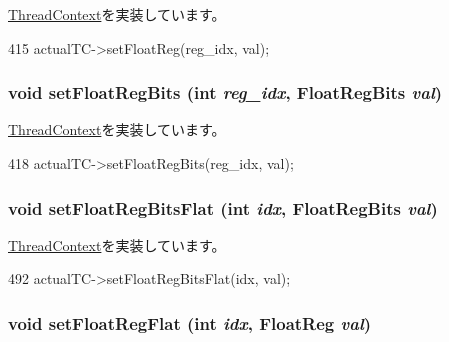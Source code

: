 \hyperlink{classThreadContext_af8dc9762fda519d911372dd6f4a28d8e}{ThreadContext}を実装しています。


\begin{DoxyCode}
415     { actualTC->setFloatReg(reg_idx, val); }
\end{DoxyCode}
\hypertarget{classProxyThreadContext_a618651078f08ecd328dfe3312f0f2ea7}{
\subsubsection[{setFloatRegBits}]{\setlength{\rightskip}{0pt plus 5cm}void setFloatRegBits (int {\em reg\_\-idx}, \/  {\bf FloatRegBits} {\em val})}}
\label{classProxyThreadContext_a618651078f08ecd328dfe3312f0f2ea7}


\hyperlink{classThreadContext_a8f0c8b07cd1c4a6019a5b3922689d1db}{ThreadContext}を実装しています。


\begin{DoxyCode}
418     { actualTC->setFloatRegBits(reg_idx, val); }
\end{DoxyCode}
\hypertarget{classProxyThreadContext_acd974292ff0461c2e94c0b5a1126b503}{
\subsubsection[{setFloatRegBitsFlat}]{\setlength{\rightskip}{0pt plus 5cm}void setFloatRegBitsFlat (int {\em idx}, \/  {\bf FloatRegBits} {\em val})}}
\label{classProxyThreadContext_acd974292ff0461c2e94c0b5a1126b503}


\hyperlink{classThreadContext_a2964ca7e974bf80017ee30d832b32a35}{ThreadContext}を実装しています。


\begin{DoxyCode}
492     { actualTC->setFloatRegBitsFlat(idx, val); }
\end{DoxyCode}
\hypertarget{classProxyThreadContext_a71ec23ca2c029120932e5af4babc0da1}{
\subsubsection[{setFloatRegFlat}]{\setlength{\rightskip}{0pt plus 5cm}void setFloatRegFlat (int {\em idx}, \/  {\bf FloatReg} {\em val})}}
\label{classProxyThreadContext_a71ec23ca2c029120932e5af4babc0da1}


